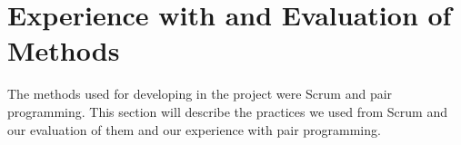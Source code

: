 \section{Experience with and Evaluation of Methods}
The methods used for developing in the project were Scrum and pair programming. This section will describe the practices we used from Scrum and our evaluation of them and our experience with pair programming.

